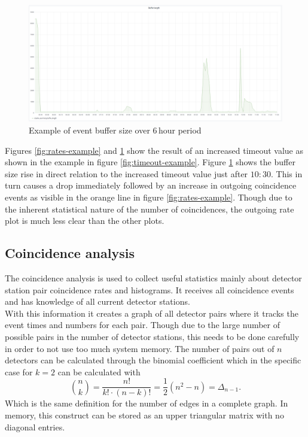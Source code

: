 \documentclass[abstract,toc,los,lof,english,10pt,glossary,acronyms]{jluthesis}
\begin{document}
\begin{figure}[ht!]
\centering
\includegraphics[width=\linewidth]{data/dnp_buffer}
\caption{Example of event buffer size over $6\,\text{hour}$ period}
\label{fig:rates-buffer}
\end{figure}
Figures \ref{fig:rates-example} and \ref{fig:rates-buffer} show the result of an increased timeout value as shown in the example in figure \ref{fig:timeout-example}. Figure \ref{fig:rates-buffer} shows the buffer size rise in direct relation to the increased timeout value just after $10:30$. This in turn causes a drop immediately followed by an increase in outgoing coincidence events as visible in the orange line in figure \ref{fig:rates-example}. Though due to the inherent statistical nature of the number of coincidences, the outgoing rate plot is much less clear than the other plots.
\clearpage
\subsection{Coincidence analysis}\label{subsec:coincidence-s}
The coincidence analysis is used to collect useful statistics mainly about detector station pair coincidence rates and histograms. It receives all coincidence events and has knowledge of all current detector stations. \\
With this information it creates a graph of all detector pairs where it tracks the event times and numbers for each pair. Though due to the large number of possible pairs in the number of detector stations, this needs to be done carefully in order to not use too much system memory. The number of pairs out of $n$ detectors can be calculated through the binomial coefficient which in the specific case for $k = 2$ can be calculated with
\begin{equation}
	{n \choose k} = \frac{n!}{k!\cdot\left(n - k\right)!} = \frac{1}{2}\left(n^2 - n\right) = \Delta_{n-1}.
\end{equation}
Which is the same definition for the number of edges in a complete graph. In memory, this construct can be stored as an upper triangular matrix with no diagonal entries.
\end{document}
